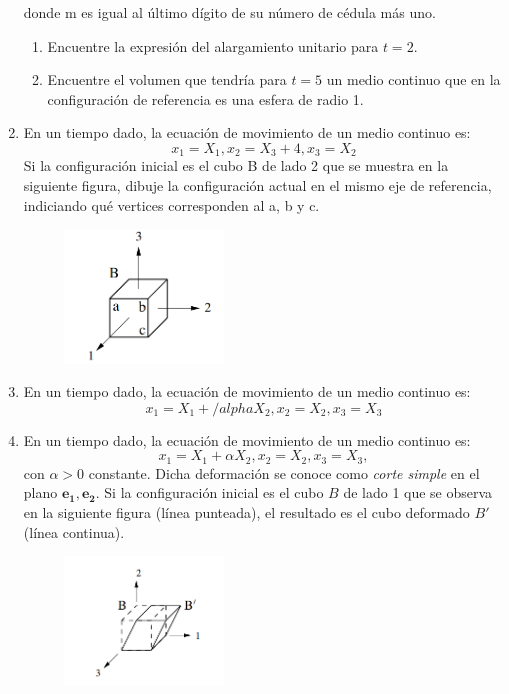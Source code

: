 \documentclass[12pt,a4paper]{article}
\begin{document}
\begin{enumerate}
   donde m es igual al último dígito de su número de cédula más uno.
   \begin{enumerate}
       \item Encuentre la expresión del alargamiento unitario para $t=2$.
       \item Encuentre el volumen que tendría para $t=5$ un medio continuo que en la
       configuración de referencia es una esfera de radio 1.
   \end{enumerate}
\item En un tiempo dado, la ecuación de movimiento de un medio continuo es:
    \begin{equation}
        x_1=X_1,x_2=X_3+4,x_3=X_2
    \end{equation}
    Si la configuración inicial es el cubo B de lado 2 que se muestra en la siguiente figura, dibuje la configuración  actual en el mismo eje de referencia, indiciando qué vertices corresponden al a, b y c.   
    \begin{figure}[H]
        \centering
        \includegraphics[width=0.4\textwidth]{tp3-2.png}
    \end{figure}
    \item En un tiempo dado, la ecuación de movimiento de un medio continuo es:
    \begin{equation}
        x_1=X_1+/alpha X_2,x_2=X_2,x_3=X_3
    \end{equation}
    \item En un tiempo dado, la ecuación de movimiento de un medio continuo es:
    \begin{equation}
        x_1=X_1+\alpha X_2,x_2=X_2,x_3=X_3,
    \end{equation}
    con $\alpha>0$ constante. Dicha deformación se conoce como \textit{corte simple} en el plano $\mathbf{e_1,e_2}$. Si la configuración inicial es el cubo $B$ de lado 1 que se observa en la siguiente figura (línea punteada), el resultado es el cubo deformado $B'$ (línea continua).    
    \begin{figure}[H]
        \centering
        \includegraphics[width=0.4\textwidth]{tp3-3.png}

\end{figure}
\end{enumerate}
\end{document}
